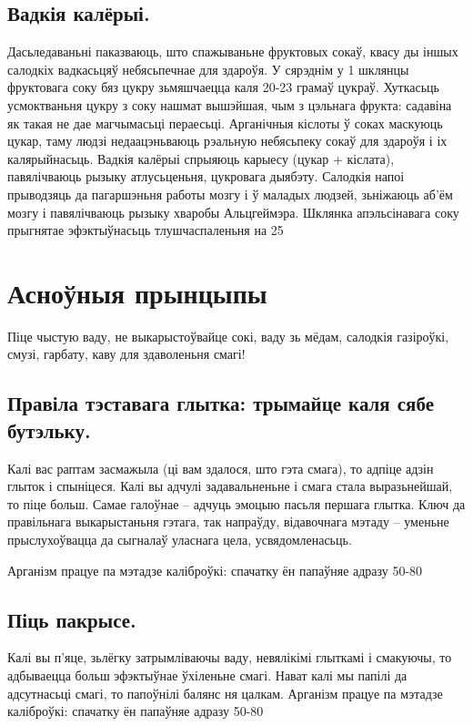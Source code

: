 \subsection{Вадкія калёрыі.}
Дасьледаваньні паказваюць, што спажываньне фруктовых сокаў, квасу ды іншых салодкіх вадкасьцяў небясьпечнае для здароўя. У сярэднім у 1 шклянцы фруктовага соку бяз цукру зьмяшчаецца каля 20-23 грамаў цукраў. Хуткасьць усмоктваньня цукру з соку нашмат вышэйшая, чым з цэльнага фрукта: садавіна як такая не дае магчымасьці пераесьці. Арганічныя кіслоты ў соках маскуюць цукар, таму людзі недаацэньваюць рэальную небясьпеку сокаў для здароўя і іх калярыйнасьць. Вадкія калёрыі спрыяюць карыесу (цукар + кіслата), павялічваюць рызыку атлусьценьня, цукровага дыябэту. Салодкія напоі прыводзяць да пагаршэньня работы мозгу і ў маладых людзей, зьніжаюць аб'ём мозгу і павялічваюць рызыку хваробы Альцгеймэра. Шклянка апэльсінавага соку прыгнятае эфэктыўнасьць тлушчаспаленьня на 25%

\section{Асноўныя прынцыпы}

Піце чыстую ваду, не выкарыстоўвайце сокі, ваду зь мёдам, салодкія газіроўкі, смузі, гарбату, каву для здаволеньня смагі!

\subsection{Правіла тэставага глытка: трымайце каля сябе бутэльку.}
Калі вас раптам засмажыла (ці вам здалося, што гэта смага), то адпіце адзін глыток і спыніцеся. Калі вы адчулі задавальненьне і смага стала выразьнейшай, то піце больш. Самае галоўнае – адчуць эмоцыю пасьля першага глытка. Ключ да правільнага выкарыстаньня гэтага, так напраўду, відавочнага мэтаду – уменьне прыслухоўвацца да сыгналаў уласнага цела, усвядомленасьць.

Арганізм працуе па мэтадзе каліброўкі: спачатку ён папаўняе адразу 50-80%

\subsection{Піць пакрысе.}
Калі вы п'яце, зьлёгку затрымліваючы ваду, невялікімі глыткамі і смакуючы, то адбываецца больш эфэктыўнае ўхіленьне смагі. Нават калі мы папілі да адсутнасьці смагі, то папоўнілі балянс ня цалкам. Арганізм працуе па мэтадзе каліброўкі: спачатку ён папаўняе адразу 50-80%

